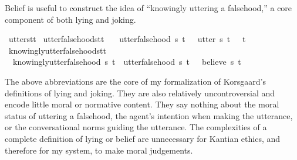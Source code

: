 \begin{isabellebody}
\begin{isamarkuptext}
Belief is useful to construct the idea of ``knowingly uttering a falsehood,'' a core component 
of both lying and joking.%
\end{isamarkuptext}\isamarkuptrue%
\isamarkupfalse%
\ utter{\isacharcolon}{\isacharcolon}{\isachardoublequoteopen}s{\isasymRightarrow}t{\isasymRightarrow}t{\isachardoublequoteclose}\isanewline
%
\isanewline
{}\isamarkupfalse%
\ utter{\isacharunderscore}falsehood{\isacharcolon}{\isacharcolon}{\isachardoublequoteopen}s{\isasymRightarrow}t{\isasymRightarrow}t{\isachardoublequoteclose}\ \isanewline
\ \ {\isachardoublequoteopen}utter{\isacharunderscore}falsehood\ s\ t\ {\isasymequiv}\ \ {\isacharparenleft}utter\ s\ t{\isacharparenright}\ \isactrlbold {\isasymand}\ {\isacharparenleft}\isactrlbold {\isasymnot}\ t{\isacharparenright}{\isachardoublequoteclose}\isanewline
%
\isanewline
{}\isamarkupfalse%
\ knowingly{\isacharunderscore}utter{\isacharunderscore}falsehood{\isacharcolon}{\isacharcolon}{\isachardoublequoteopen}s{\isasymRightarrow}t{\isasymRightarrow}t{\isachardoublequoteclose}\ \isanewline
\ \ {\isachardoublequoteopen}knowingly{\isacharunderscore}utter{\isacharunderscore}falsehood\ s\ t\ {\isasymequiv}\ {\isacharparenleft}utter{\isacharunderscore}falsehood\ s\ t{\isacharparenright}\ \isactrlbold {\isasymand}\ {\isacharparenleft}\isactrlbold {\isasymnot}\ {\isacharparenleft}believe\ s\ t{\isacharparenright}{\isacharparenright}{\isachardoublequoteclose}\isanewline
%
%
\begin{isamarkuptext}%
The above abbreviations are the core of my formalization of Korsgaard's definitions
of lying and joking. They are also relatively uncontroversial and encode little moral
or normative content. They say nothing about the moral status of uttering a falsehood, 
the agent's intention when making the utterance, or the conversational norms guiding the utterance. 
The complexities of a complete definition of lying or belief are 
unnecessary for Kantian ethics, and therefore for my system, to make moral judgements. 


\end{isamarkuptext}
\end{isabellebody}
